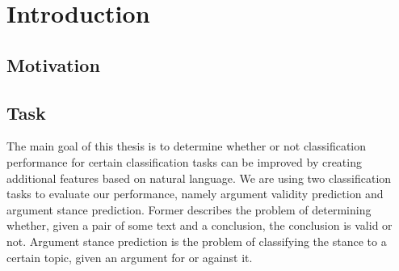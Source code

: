 \section{Introduction}
\subsection{Motivation}
\subsection{Task}
The main goal of this thesis is to determine whether or not classification performance for certain classification tasks can be improved by creating additional features based on natural language. We are using two classification tasks to evaluate our performance, namely argument validity prediction and argument stance prediction. Former describes the problem of determining whether, given a pair of some text and a conclusion, the conclusion is valid or not. Argument stance prediction is the problem of classifying the stance to a certain topic, given an argument for or against it. \\
